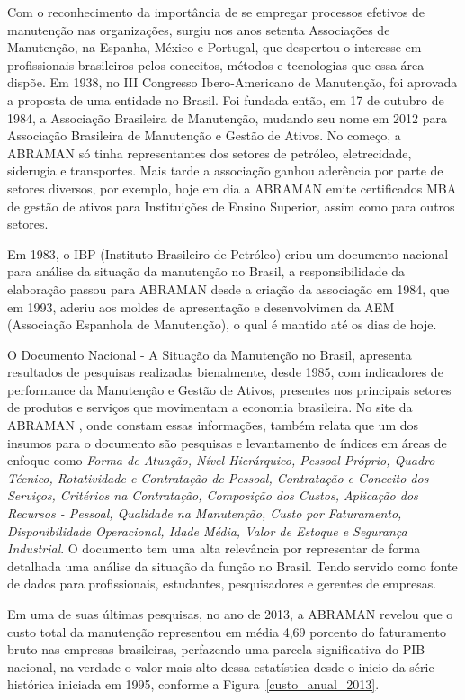 Com o reconhecimento da importância de se empregar processos efetivos de manutenção nas organizações, surgiu nos anos setenta Associações de Manutenção, na Espanha, México e Portugal, que despertou o interesse em profissionais brasileiros pelos conceitos, métodos e tecnologias que essa área dispõe. Em 1938, no III Congresso Ibero-Americano de Manutenção, foi aprovada a proposta de uma entidade no Brasil. Foi fundada então, em 17 de outubro de 1984, a Associação Brasileira de Manutenção, mudando seu nome em 2012 para Associação Brasileira de Manutenção e Gestão de Ativos. No começo, a ABRAMAN só tinha representantes dos setores de petróleo, eletrecidade, siderugia e transportes. Mais tarde a associação ganhou aderência por parte de setores diversos, por exemplo, hoje em dia a ABRAMAN emite certificados MBA de gestão de ativos para Instituições de Ensino Superior, assim como para outros setores. 

Em 1983, o IBP (Instituto Brasileiro de Petróleo) criou um documento nacional para análise da situação da manutenção no Brasil, a responsibilidade da elaboração passou para ABRAMAN desde a criação da associação em 1984, que em 1993, aderiu aos moldes de apresentação e desenvolvimen da AEM (Associação Espanhola de Manutenção), o qual é mantido até os dias de hoje.  

O Documento Nacional - A Situação da Manutenção no Brasil, apresenta resultados de pesquisas realizadas bienalmente, desde 1985, com indicadores de performance da Manutenção e Gestão de Ativos, presentes nos principais setores de produtos e serviços que movimentam a economia brasileira. No site da ABRAMAN \cite{abraman}, onde constam essas informações, também relata que um dos insumos para o documento são pesquisas e levantamento de índices em áreas de enfoque como \emph{Forma de Atuação, Nível Hierárquico, Pessoal Próprio, Quadro Técnico, Rotatividade e Contratação de Pessoal, Contratação e Conceito dos Serviços, Critérios na Contratação, Composição dos Custos, Aplicação dos Recursos - Pessoal, Qualidade na Manutenção, Custo por Faturamento, Disponibilidade Operacional, Idade Média, Valor de Estoque e Segurança Industrial}. O documento tem uma alta relevância por representar de forma detalhada uma análise da situação da função no Brasil. Tendo servido como fonte de dados para profissionais, estudantes, pesquisadores e gerentes de empresas.

Em uma de suas últimas pesquisas, no ano de 2013, a ABRAMAN revelou que o custo total da manutenção representou em média 4,69 porcento do faturamento bruto nas empresas brasileiras, perfazendo uma parcela significativa do PIB nacional, na verdade o valor mais alto dessa estatística desde o inicio da série histórica iniciada em 1995, conforme a Figura~\ref{custo_anual_2013}.

